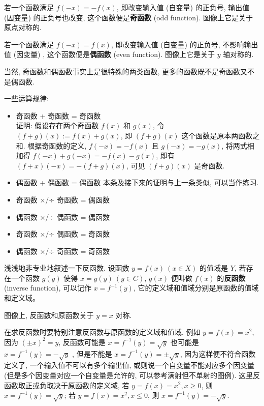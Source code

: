 \begin{tcolorbox}[size=fbox, breakable, enhanced jigsaw, title={奇偶性 (parity 大嘘)}]

若一个函数满足 $f(-x)=-f(x)$, 即改变输入值 (自变量) 的正负号, 输出值
(因变量) 的正负号也改变, 这个函数便是\textbf{奇函数} (odd function).
图像上它是关于原点对称的.

若一个函数满足 $f(-x)=f(x)$, 即改变输入值 (自变量) 的正负号,
不影响输出值 (因变量) , 这个函数便是\textbf{偶函数} (even function).
图像上它是关于 $y$ 轴对称的.

当然, 奇函数和偶函数事实上是很特殊的两类函数,
更多的函数既不是奇函数又不是偶函数.

一些运算规律:

\begin{itemize}

\item
  奇函数 + 奇函数 = 奇函数\\{\kaishu 证明}: 假设存在两个奇函数 $f(x)$ 和
  $g(x)$, 令 $(f+g)(x) := f(x) + g(x)$, 即 $(f+g)(x)$
  这个函数是原本两函数之和. 根据奇函数的定义, $f(-x)=-f(x)$ 且
  $g(-x)=-g(x)$, 将两式相加得 $f(-x)+g(-x)=-f(x)-g(x)$, 即有
  $(f+x)(-x)=-(f+g)(x)$, 可见 $(f+g)(x)$ 是奇函数.
\item
  偶函数 + 偶函数 = 偶函数 本条及接下来的证明与上一条类似, 可以当作练习.
\item
  奇函数 ×/÷ 奇函数 = 偶函数
\item
  偶函数 ×/÷ 偶函数 = 偶函数
\item
  奇函数 ×/÷ 偶函数 = 奇函数
\item
  偶函数 ×/÷ 奇函数 = 奇函数
\end{itemize}

\end{tcolorbox}

\begin{tcolorbox}[size=fbox, breakable, enhanced jigsaw, title={反函数 (inverse
function)}]

浅浅地非专业地叙述一下反函数. 设函数 $y=f(x)\ (x\in X)$ 的值域是
$Y$, 若存在一个函数 $g(y)$ 使得 $x= g(y)\ (y\in C)$, $g(x)$
便叫做 $f(x)$ 的\textbf{反函数} (inverse function), 可以记作
$x=f^{-1}(y)$, 它的定义域和值域分别是原函数的值域和定义域。

图像上, 反函数和原函数关于 $y=x$ 对称.

在求反函数时要特别注意反函数与原函数的定义域和值域. 例如 $y=f(x)=x^2$,
因为 $(\pm x)^2=y$, 反函数可能是 $x=f^{-1}(y)=\sqrt{y}$ 也可能是
$x=f^{-1}(y)=-\sqrt{y}$ , 但是不能是 $x=f^{-1}(y)=\pm\sqrt{y}$,
因为这样便不符合函数定义了, 一个输入值不可以有多个输出值,
或则说一个自变量不能对应多个因变量
(但是多个因变量对应一个自变量是允许的, 可以参考满射但不单射的图例).
这里反函数取正或负取决于原函数的定义域, 若 $y=f(x)=x^2, x\ge 0$, 则
$x=f^{-1}(y)=\sqrt{y}$; 若 $y=f(x)=x^2, x\le 0$, 则
$x=f^{-1}(y)=-\sqrt{y}$.

\end{tcolorbox}

